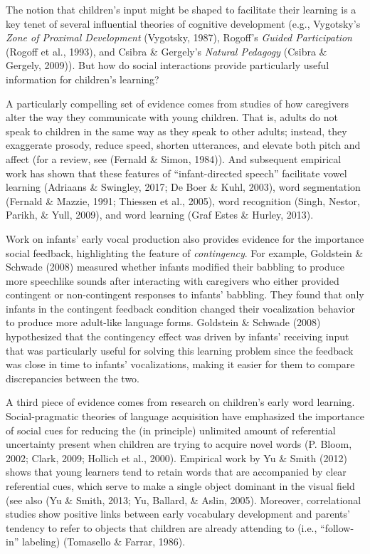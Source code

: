 \documentclass[a4paper,man,apacite,floatsintext]{apa6}
\begin{document}
The notion that children's input might be shaped to facilitate their
learning is a key tenet of several influential theories of cognitive
development (e.g., Vygotsky's \emph{Zone of Proximal Development}
(Vygotsky, 1987), Rogoff's \emph{Guided Participation} (Rogoff et al.,
1993), and Csibra \& Gergely's \emph{Natural Pedagogy} (Csibra \&
Gergely, 2009)). But how do social interactions provide particularly
useful information for children's learning?

A particularly compelling set of evidence comes from studies of how
caregivers alter the way they communicate with young children. That is,
adults do not speak to children in the same way as they speak to other
adults; instead, they exaggerate prosody, reduce speed, shorten
utterances, and elevate both pitch and affect (for a review, see
(Fernald \& Simon, 1984)). And subsequent empirical work has shown that
these features of ``infant-directed speech'' facilitate vowel learning
(Adriaans \& Swingley, 2017; De Boer \& Kuhl, 2003), word segmentation
(Fernald \& Mazzie, 1991; Thiessen et al., 2005), word recognition
(Singh, Nestor, Parikh, \& Yull, 2009), and word learning (Graf Estes \&
Hurley, 2013).

Work on infants' early vocal production also provides evidence for the
importance social feedback, highlighting the feature of
\emph{contingency}. For example, Goldstein \& Schwade (2008) measured
whether infants modified their babbling to produce more speechlike
sounds after interacting with caregivers who either provided contingent
or non-contingent responses to infants' babbling. They found that only
infants in the contingent feedback condition changed their vocalization
behavior to produce more adult-like language forms. Goldstein \& Schwade
(2008) hypothesized that the contingency effect was driven by infants'
receiving input that was particularly useful for solving this learning
problem since the feedback was close in time to infants' vocalizations,
making it easier for them to compare discrepancies between the two.

A third piece of evidence comes from research on children's early word
learning. Social-pragmatic theories of language acquisition have
emphasized the importance of social cues for reducing the (in principle)
unlimited amount of referential uncertainty present when children are
trying to acquire novel words (P. Bloom, 2002; Clark, 2009; Hollich et
al., 2000). Empirical work by Yu \& Smith (2012) shows that young
learners tend to retain words that are accompanied by clear referential
cues, which serve to make a single object dominant in the visual field
(see also (Yu \& Smith, 2013; Yu, Ballard, \& Aslin, 2005). Moreover,
correlational studies show positive links between early vocabulary
development and parents' tendency to refer to objects that children are
already attending to (i.e., ``follow-in'' labeling) (Tomasello \&
Farrar, 1986).
\end{document}

